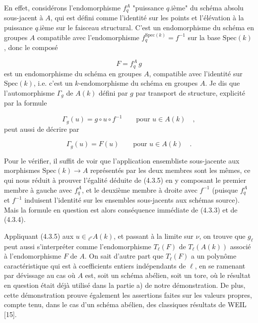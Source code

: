 En effet, considérons l'endomorphisme $f_q^A$ "puissance $q$.ième" du schéma absolu sous-jacent à $A$, qui est défini comme l'identité sur les points et l'élévation à la puissance $q$.ième sur le faisceau structural. C'est un endomorphisme du schéma en groupes $A$ compatible avec l'endomorphisme $f_q^{\mathrm{Spec}(k)} = f^{-1}$ sur la base $\mathrm{Spec}(k)$, donc le composé

\begin{equation}\tag{4.3.3}
F = f_q^A\, g
\end{equation}
est un endomorphisme du schéma en groupes $A$, compatible avec l'identité sur $\mathrm{Spec}(k)$, i.e. c'est un $k$-endomorphisme du schéma en groupes $A$. Je dis que l'automorphisme $\Gamma_g$ de $A(k)$ défini par $g$ par transport de structure, explicité par la formule

\begin{equation}\tag{4.3.4}
\Gamma_g(u) = g \circ u \circ f^{-1} \qquad \mbox{pour } u \in A(k) \quad ,
\end{equation}
peut aussi de décrire par

\begin{equation}\tag{4.3.5}
\Gamma_g(u) = F(u) \qquad \mbox{pour } u \in A(k) \quad .
\end{equation}


Pour le vérifier, il suffit de voir que l'application ensembliste sous-jacente aux morphismes $\mathrm{Spec}(k) \longrightarrow A$ représentés par les deux membres sont les mêmes, ce qui nous réduit à prouver l'égalité déduite de (4.3.5) en y composant le premier membre à gauche avec $f_q^A$, et le deuxième membre à droite avec $f^{-1}$ (puisque $f_q^A$ et $f^{-1}$ induisent l'identité sur les ensembles sous-jacents aux schémas source). Mais la formule en question est alors conséquence immédiate de (4.3.3) et de (4.3.4).

Appliquant (4.3.5) aux $u \in {}_{\ell^\nu}A(k)$, et passant à la limite sur $\nu$, on trouve que $g_\ell$ peut aussi s'interpréter comme l'endomorphisme $T_\ell(F)$ de $T_\ell(A(k))$ associé à l'endomorphisme $F$ de $A$. On sait d'autre part que $T_\ell(F)$ a un polynôme caractéristique qui est à coefficients entiers indépendants de $\ell$, en se ramenant par dévissage au cas où $A$ est, soit un schéma abélien, soit un tore, où le résultat en question était déjà utilisé dans la partie a) de notre démonstration. De plus, cette démonstration prouve également les assertions faites sur les valeurs propres, compte tenu, dans le cas d'un schéma abélien, des classiques résultats de WEIL [15].

